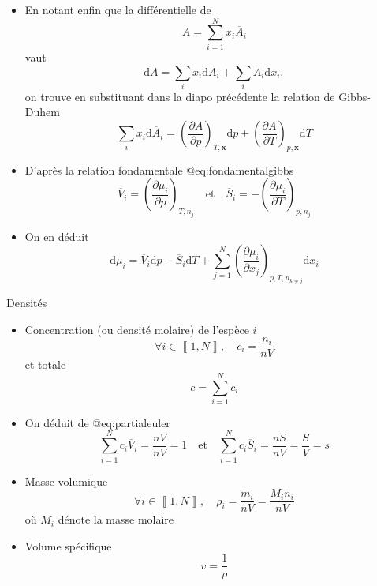 \documentclass[
  ignorenonframetext,
]{beamer}
\providecommand{\tightlist}{%
  \setlength{\itemsep}{0pt}\setlength{\parskip}{0pt}}
\begin{document}
\begin{frame}
\begin{itemize}
\tightlist
\item
  En notant enfin que la différentielle de \[
  A = \sum _ {i = 1} ^ N x _ i \overline{A} _ i
  \] vaut \[
  \mathrm{d} A = \sum _ i x _ i \mathrm{d} \overline{A} _ i + \sum _ i \overline{A} _ i \mathrm{d} x_ i,
  \] on trouve en substituant dans la diapo précédente la relation de
  Gibbs-Duhem \[
   \sum _ i x _ i \mathrm{d} \overline{A} _ i = \left ( \frac{\partial A}{\partial p} \right ) _ {T, \mathbf{x}} \mathrm{d} p + \left ( \frac{\partial A}{\partial T} \right ) _ {p, \mathbf{x}} \mathrm{d} T
  \]
\end{itemize}
\end{frame}

\begin{frame}
\begin{itemize}
\tightlist
\item
  D'après la relation fondamentale @eq:fondamentalgibbs \[
  \overline{V} _ i = \left ( \frac{\partial \mu _ i}{\partial p} \right ) _ {T, n _ j} \quad \mathrm{et} \quad \overline{S} _ i = - \left ( \frac{\partial \mu _ i}{\partial T} \right ) _ {p, n _ j}
  \]
\item
  On en déduit \[
  \mathrm{d} \mu _ i = \overline{V} _ i \mathrm{d} p - \overline{S} _ i \mathrm{d} T + \sum _ {j = 1} ^ N \left ( \frac{\partial \mu _ i}{\partial x _ j} \right ) _ {p, T, n _ {k \ne j}} \mathrm{d} x _ i
  \]
\end{itemize}
\end{frame}

\begin{frame}{Densités}
\protect\hypertarget{densituxe9s}{}
\begin{itemize}
\tightlist
\item
  Concentration (ou densité molaire) de l'espèce \(i\) \[
  \forall i \in \left \llbracket 1, N \right \rrbracket, \quad c _ i = \frac{n _ i}{n V}
  \] et totale \[
  c = \sum _ {i = 1} ^ N c _ i
  \]
\item
  On déduit de @eq:partialeuler \[
  \sum _ {i = 1} ^ N c_ i \overline{V} _ i = \frac{n V}{n V} = 1 \quad \mathrm{et} \quad \sum _ {i = 1} ^ N c_i \overline{S} _ i = \frac{n S}{n V} = \frac{S}{V} = s
  \]
\end{itemize}
\end{frame}

\begin{frame}
\begin{itemize}
\tightlist
\item
  Masse volumique \[
  \forall i \in \left \llbracket 1, N \right \rrbracket, \quad \rho _ i = \frac{m _ i}{n V} = \frac{M _ i n _ i}{n V}
  \] où \(M _ i\) dénote la masse molaire
\item
  Volume spécifique \[
  v = \frac{1}{\rho}
  \]
\end{itemize}
\end{frame}
\end{document}
